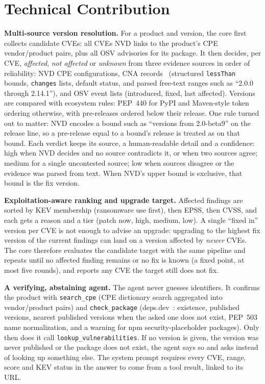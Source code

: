 \documentclass[final]{cvpr}
\begin{document}
\section{Technical Contribution}
\label{sec:contrib}

\textbf{Multi-source version resolution.} For a product and version, the core first collects candidate CVEs: all CVEs NVD links to the product's CPE vendor/product pairs, plus all OSV advisories for its package. It then decides, per CVE, \emph{affected}, \emph{not affected} or \emph{unknown} from three evidence sources in order of reliability: NVD CPE configurations, CNA records~\cite{cvelistv5} (structured \texttt{lessThan} bounds, \texttt{changes} lists, default status, and parsed free-text ranges such as ``2.0.0 through 2.14.1''), and OSV event lists (introduced, fixed, last affected). Versions are compared with ecosystem rules: PEP~440 for PyPI and Maven-style token ordering otherwise, with pre-releases ordered below their release. One rule turned out to matter: NVD encodes a bound such as ``versions from 2.0-beta9'' on the release line, so a pre-release equal to a bound's release is treated as on that bound. Each verdict keeps its source, a human-readable detail and a confidence: high when NVD decides and no source contradicts it, or when two sources agree; medium for a single uncontested source; low when sources disagree or the evidence was parsed from text. When NVD's upper bound is exclusive, that bound is the fix version.

\textbf{Exploitation-aware ranking and upgrade target.} Affected findings are sorted by KEV membership (ransomware use first), then EPSS, then CVSS, and each gets a reason and a tier (patch now, high, medium, low). A single ``fixed in'' version per CVE is not enough to advise an upgrade: upgrading to the highest fix version of the current findings can land on a version affected by \emph{newer} CVEs. The core therefore evaluates the candidate target with the same pipeline and repeats until no affected finding remains or no fix is known (a fixed point, at most five rounds), and reports any CVE the target still does not fix.

\textbf{A verifying, abstaining agent.} The agent never guesses identifiers. It confirms the product with \texttt{search\_cpe} (CPE dictionary search aggregated into vendor/product pairs) and \texttt{check\_package} (deps.dev~\cite{depsdev}: existence, published versions, nearest published versions when the asked one does not exist, PEP~503 name normalization, and a warning for npm security-placeholder packages). Only then does it call \texttt{lookup\_vulnerabilities}. If no version is given, the version was never published or the package does not exist, the agent says so and asks instead of looking up something else. The system prompt requires every CVE, range, score and KEV status in the answer to come from a tool result, linked to its URL.
\end{document}
